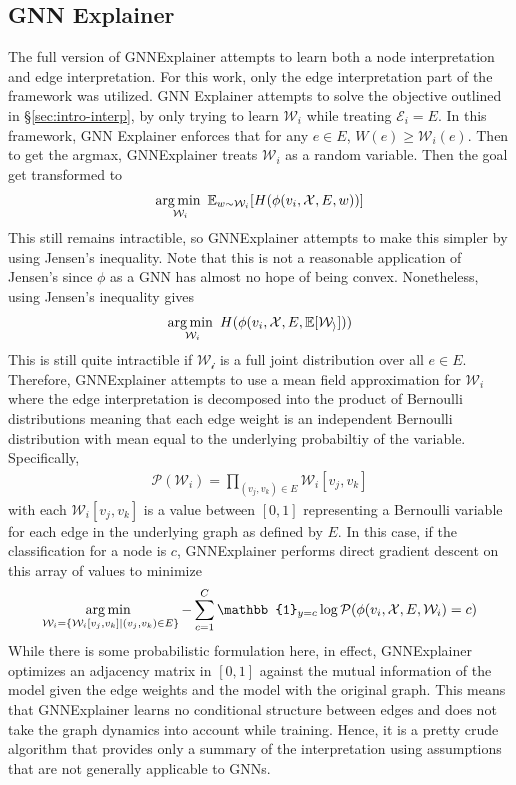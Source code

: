 \subsection{GNN Explainer}
The full version of GNNExplainer attempts to learn both a node interpretation and edge interpretation. For this work, only the edge interpretation part of the framework was utilized. GNN Explainer attempts to solve the objective outlined in \S\ref{sec:intro-interp}, by only trying to learn $\mathcal{W}_i$ while treating $\mathcal{E}_i = E$. In this framework, GNN Explainer enforces that for any $e \in E$, $W(e) \geq \mathcal{W}_i(e)$. Then to get the argmax, GNNExplainer treats $\mathcal{W}_i$ as a random variable. Then the goal get transformed to 
\begin{align*}
	\operatorname*{arg\,min\,\,}_{\mathcal{W}_i} \mathbb{E}_{w \sim \mathcal{W}_i} [H(\phi(v_i, \mathcal{X}, E, w))]
\end{align*}
This still remains intractible, so GNNExplainer attempts to make this simpler by using Jensen's inequality. Note that this is not a reasonable application of Jensen's since $\phi$ as a GNN has almost no hope of being convex. Nonetheless, using Jensen's inequality gives
\begin{align*}
	\operatorname*{arg\,min\,\,}_{\mathcal{W}_i} H(\phi(v_i, \mathcal{X}, E, \mathbb{E}[\mathcal{W_i}]))
\end{align*}
This is still quite intractible if $\mathcal{W_i}$ is a full joint distribution over all $e \in E$. Therefore, GNNExplainer attempts to use a mean field approximation for $\mathcal{W}_i$ where the edge interpretation is decomposed into the product of Bernoulli distributions meaning that each edge weight is an independent Bernoulli distribution with mean equal to the underlying probabiltiy of the variable. Specifically,
\begin{align*}
	\mathcal{P}(\mathcal{W}_i) = \prod_{(v_j, v_k) \in E} \mathcal{W}_i[v_j, v_k]
\end{align*}
with each $\mathcal{W}_i[v_j, v_k]$ is a value between $[0, 1]$ representing a Bernoulli variable for each edge in the underlying graph as defined by $E$. In this case, if the classification for a node is $c$, GNNExplainer performs direct gradient descent on this array of values to minimize
\begin{align*}
	\argmin_{\mathcal{W}_i = \{\mathcal{W}_i[v_j, v_k] \mid (v_j, v_k) \in E\}} -\sum_{c=1}^C \mathbb{1}_{y = c} \log \mathcal{P}(\phi(v_i, \mathcal{X}, E, \mathcal{W}_i) = c)
\end{align*}
While there is some probabilistic formulation here, in effect, GNNExplainer optimizes an adjacency matrix in $[0, 1]$ against the mutual information of the model given the edge weights and the model with the original graph. This means that GNNExplainer learns no conditional structure between edges and does not take the graph dynamics into account while training. Hence, it is a pretty crude algorithm that provides only a summary of the interpretation using assumptions that are not generally applicable to GNNs.
